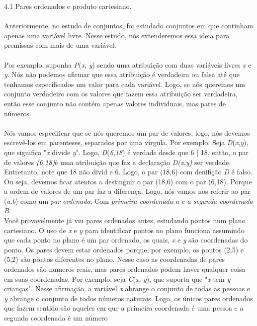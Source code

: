 \large 4.1 Pares ordenados e produto cartesiano.
\\
\\


Anteriormente, no estudo de conjuntos, foi estudado conjuntos em que continham apenas uma variável livre. Nesse estudo, nós extenderemos essa ideia para premissas com mais de uma variável.
\\
\\
\indent Por exemplo, suponha \textit{P}(\textit{x}, \textit{y}) sendo  uma atribuição com duas variáveis livres \textit{x} e \textit{y}. Nós não podemos afirmar que essa atribuição é verdadeira ou falsa até que tenhamos especificados um valor para cada variável. Logo, se nós queremos um conjunto verdadeiro com os valores que fazem essa atribuição ser verdadeira, então esse 
conjunto não contém apenas valores individuais, mas pares de números.
\\
\\
Nós vamos especificar que se nós queremos um par de valores, logo, nós devemos escrevê-los em parenteses, separados por uma 
vírgula. Por exemplo: Seja \textit{D}(\textit{x},\textit{y}), que significa "\textit{x} divide \textit{y}". Logo,
\textit{D}(\textit{6},\textit{18}) é verdade desde que 6 | 18, então, o par de valores \textit{(6,18)}é uma atribuição que faz a declaração \textit{D(x,y)} ser verdade. Entretanto, note que 18 não divid e 6. Logo, o par (18,6) 
com denifição \textit{D} é falso. Ou seja, devemos ficar atentos a destinguir o par (18,6) com o par (6,18). Porque a ordem de valores de um par faz a diferença.
Logo, nós vamos nos referir ao par (\textit{a},\textit{b}) como um \textit{par ordenado}, Com \textit{primeira coordenada a e  a segunda coordenada B}.
\\
\indent Você provavelmente já viu pares ordenados antes, estudando pontos num plano cartesiano. O uso de \textit{x} e \textit{y} para 
identificar pontos no plano funciona assumindo que cada ponto no plano é um par ordenado, os quais, \textit{x} e \textit{y} são
coordenadas do ponto. Os pares devem estar ordenados porque, por exemplo, os pontos (2,5) e (5,2) são pontos diferentes no plano.
Nesse caso as coordenadas de pares ordenados são numeros reais, mas pares ordenados podem haver qualquer coisa em suas coordenadas. Por exemplo, seja \textit{C}(\textit{x}, \textit{y}), que suporta que "\textit{x} tem \textit{y} crianças". Nesse afirmação, a 
variável \textit{x} abrange o conjunto de todas as pessoas e \textit{y} abrange o conjunto de todos números naturais. Logo, os 
únicos pares ordenados que fazem sentido são aqueles em que a primeira coordenada é uma pessoa e a segunda coordenada é um número
